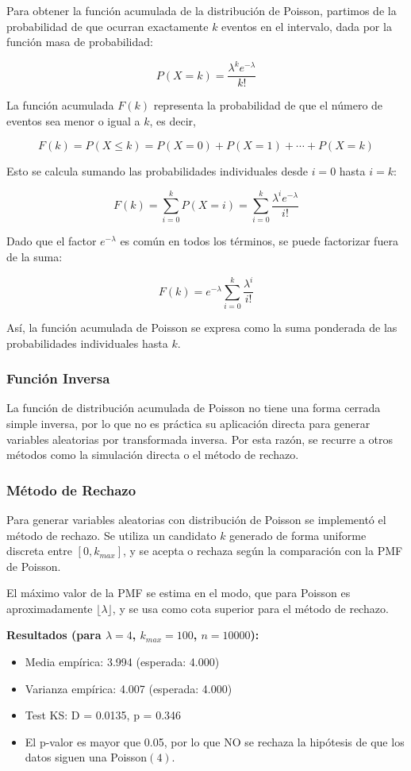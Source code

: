 \documentclass{article}
\begin{document}
Para obtener la función acumulada de la distribución de Poisson, partimos de la probabilidad de que ocurran exactamente \(k\) eventos en el intervalo, dada por la función masa de probabilidad:

\[
P(X = k) = \frac{\lambda^k e^{-\lambda}}{k!}
\]

La función acumulada \(F(k)\) representa la probabilidad de que el número de eventos sea menor o igual a \(k\), es decir,

\[
F(k) = P(X \leq k) = P(X=0) + P(X=1) + \cdots + P(X=k)
\]

Esto se calcula sumando las probabilidades individuales desde \(i=0\) hasta \(i=k\):

\[
F(k) = \sum_{i=0}^k P(X = i) = \sum_{i=0}^k \frac{\lambda^i e^{-\lambda}}{i!}
\]

Dado que el factor \(e^{-\lambda}\) es común en todos los términos, se puede factorizar fuera de la suma:

\[
F(k) = e^{-\lambda} \sum_{i=0}^k \frac{\lambda^i}{i!}
\]

Así, la función acumulada de Poisson se expresa como la suma ponderada de las probabilidades individuales hasta \(k\).


\subsubsection*{Función Inversa}
La función de distribución acumulada de Poisson no tiene una forma cerrada simple inversa, por lo que no es práctica su aplicación directa para generar variables aleatorias por transformada inversa. Por esta razón, se recurre a otros métodos como la simulación directa o el método de rechazo.

\subsubsection{Método de Rechazo}

Para generar variables aleatorias con distribución de Poisson se implementó el método de rechazo. Se utiliza un candidato $k$ generado de forma uniforme discreta entre $[0, k_{max}]$, y se acepta o rechaza según la comparación con la PMF de Poisson.

El máximo valor de la PMF se estima en el modo, que para Poisson es aproximadamente $\lfloor \lambda \rfloor$, y se usa como cota superior para el método de rechazo.

\textbf{Resultados (para $\lambda=4$, $k_{max}=100$, $n=10000$):}
\begin{itemize}
    \item Media empírica: 3.994 (esperada: 4.000)
    \item Varianza empírica: 4.007 (esperada: 4.000)
    \item Test KS: D = 0.0135, p = 0.346
    \item El p-valor es mayor que 0.05, por lo que NO se rechaza la hipótesis de que los datos siguen una Poisson$(4)$.
\end{itemize}
\end{document}
